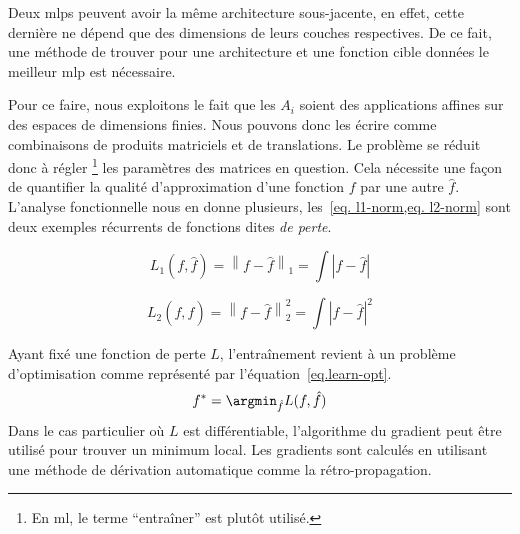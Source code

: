 Deux \glspl{mlp} peuvent avoir la même architecture sous-jacente,
en effet, cette dernière ne dépend que des dimensions de leurs couches respectives.
De ce fait, une méthode de trouver pour une architecture et une fonction cible données 
le meilleur \gls{mlp} est nécessaire.

Pour ce faire, nous exploitons le fait que 
les \(A_i\) soient des applications affines sur des espaces de dimensions finies.
Nous pouvons donc les écrire comme combinaisons de produits matriciels et de translations.
Le problème se réduit donc à régler \footnote{En \gls{ml}, le terme ``entraîner'' est plutôt utilisé.}
les paramètres des matrices en question. 
Cela nécessite une façon de quantifier la qualité d'approximation d'une fonction \(f\) par une autre \(\hat{f}\).
L'analyse fonctionnelle nous en donne plusieurs, les~\cref{eq. l1-norm,eq. l2-norm}
sont deux exemples récurrents de fonctions dites \emph{de perte}.

\begin{equation}
    \label{eq. l1-norm}
    L_1(f, \hat{f}) = \left\|f - \hat{f}\right\|_1 = \int \left|f - \hat{f}\right|
\end{equation}

\begin{equation}
    \label{eq. l2-norm}
    L_2(f, \hat{f}) = \left\|f - \hat{f}\right\|_2^2 = \int \left|f - \hat{f}\right|^2
\end{equation}

Ayant fixé une fonction de perte \(L\), 
l'entraînement revient à un problème d'optimisation comme représenté par l'équation~\ref{eq.learn-opt}.
\begin{equation}
    \label{eq.learn-opt}
    f^\ast = \argmin_{\hat{f}}{L(f, \hat{f})}
\end{equation}
Dans le cas particulier où \(L\) est différentiable, 
l'algorithme du gradient peut être utilisé pour trouver un minimum local.
Les gradients sont calculés en utilisant une méthode de dérivation automatique comme la rétro-propagation.
